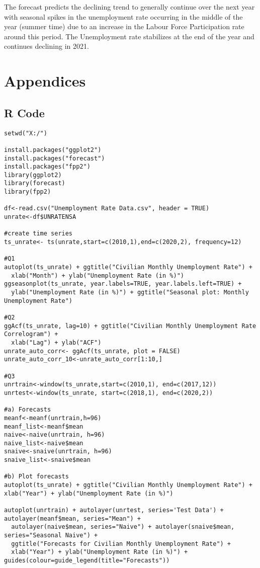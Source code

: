 \documentclass[12pt]{article}
\begin{document}
The forecast predicts the declining trend to generally continue over the next year with seasonal spikes in the unemployment rate occurring in the middle of the year (summer time) due to an increase in the Labour Force Participation rate around this period. The Unemployment rate stabilizes at the end of the year and continues declining in 2021.




\newpage
\section{Appendices}
\subsection{\textbf{R Code}}
\begin{verbatim}
setwd("X:/")

install.packages("ggplot2")
install.packages("forecast")
install.packages("fpp2")
library(ggplot2)
library(forecast)
library(fpp2)

df<-read.csv("Unemployment Rate Data.csv", header = TRUE)
unrate<-df$UNRATENSA

#create time series
ts_unrate<- ts(unrate,start=c(2010,1),end=c(2020,2), frequency=12)

#Q1
autoplot(ts_unrate) + ggtitle("Civilian Monthly Unemployment Rate") +
  xlab("Month") + ylab("Unemployment Rate (in %)")
ggseasonplot(ts_unrate, year.labels=TRUE, year.labels.left=TRUE) +
  ylab("Unemployment Rate (in %)") + ggtitle("Seasonal plot: Monthly Unemployment Rate")

#Q2
ggAcf(ts_unrate, lag=10) + ggtitle("Civilian Monthly Unemployment Rate Correlogram") +
  xlab("Lag") + ylab("ACF")
unrate_auto_corr<- ggAcf(ts_unrate, plot = FALSE)
unrate_auto_corr_10<-unrate_auto_corr[1:10,]

#Q3
unrtrain<-window(ts_unrate,start=c(2010,1), end=c(2017,12)) 
unrtest<-window(ts_unrate, start=c(2018,1), end=c(2020,2))

#a) Forecasts
meanf<-meanf(unrtrain,h=96)
meanf_list<-meanf$mean
naive<-naive(unrtrain, h=96)
naive_list<-naive$mean
snaive<-snaive(unrtrain, h=96)
snaive_list<-snaive$mean

#b) Plot forecasts
autoplot(ts_unrate) + ggtitle("Civilian Monthly Unemployment Rate") + xlab("Year") + ylab("Unemployment Rate (in %)")

autoplot(unrtrain) + autolayer(unrtest, series='Test Data') + autolayer(meanf$mean, series="Mean") +
  autolayer(naive$mean, series="Naive") + autolayer(snaive$mean, series="Seasonal Naive") + 
  ggtitle("Forecasts for Civilian Monthly Unemployment Rate") + 
  xlab("Year") + ylab("Unemployment Rate (in %)") + guides(colour=guide_legend(title="Forecasts"))


\end{verbatim}
\end{document}
